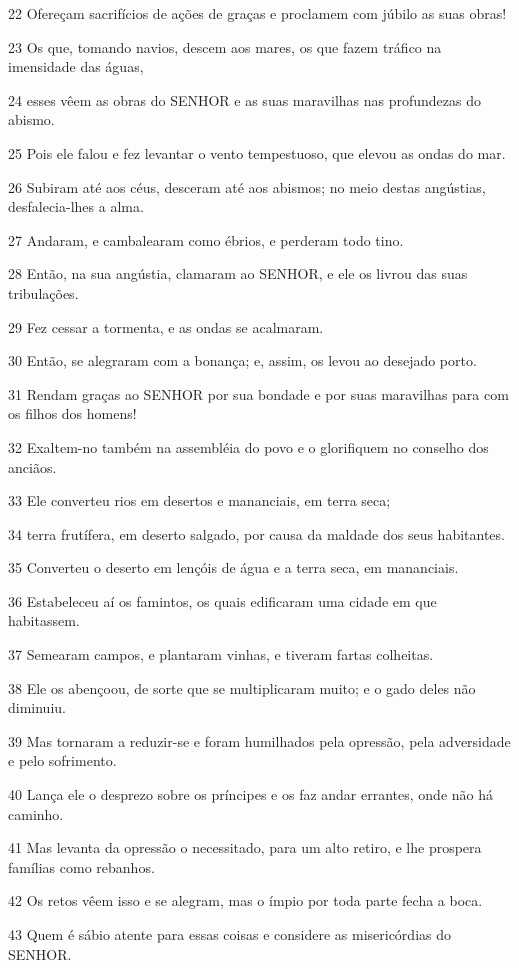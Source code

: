\par 22 Ofereçam sacrifícios de ações de graças e proclamem com júbilo as suas obras!
\par 23 Os que, tomando navios, descem aos mares, os que fazem tráfico na imensidade das águas,
\par 24 esses vêem as obras do SENHOR e as suas maravilhas nas profundezas do abismo.
\par 25 Pois ele falou e fez levantar o vento tempestuoso, que elevou as ondas do mar.
\par 26 Subiram até aos céus, desceram até aos abismos; no meio destas angústias, desfalecia-lhes a alma.
\par 27 Andaram, e cambalearam como ébrios, e perderam todo tino.
\par 28 Então, na sua angústia, clamaram ao SENHOR, e ele os livrou das suas tribulações.
\par 29 Fez cessar a tormenta, e as ondas se acalmaram.
\par 30 Então, se alegraram com a bonança; e, assim, os levou ao desejado porto.
\par 31 Rendam graças ao SENHOR por sua bondade e por suas maravilhas para com os filhos dos homens!
\par 32 Exaltem-no também na assembléia do povo e o glorifiquem no conselho dos anciãos.
\par 33 Ele converteu rios em desertos e mananciais, em terra seca;
\par 34 terra frutífera, em deserto salgado, por causa da maldade dos seus habitantes.
\par 35 Converteu o deserto em lençóis de água e a terra seca, em mananciais.
\par 36 Estabeleceu aí os famintos, os quais edificaram uma cidade em que habitassem.
\par 37 Semearam campos, e plantaram vinhas, e tiveram fartas colheitas.
\par 38 Ele os abençoou, de sorte que se multiplicaram muito; e o gado deles não diminuiu.
\par 39 Mas tornaram a reduzir-se e foram humilhados pela opressão, pela adversidade e pelo sofrimento.
\par 40 Lança ele o desprezo sobre os príncipes e os faz andar errantes, onde não há caminho.
\par 41 Mas levanta da opressão o necessitado, para um alto retiro, e lhe prospera famílias como rebanhos.
\par 42 Os retos vêem isso e se alegram, mas o ímpio por toda parte fecha a boca.
\par 43 Quem é sábio atente para essas coisas e considere as misericórdias do SENHOR.

